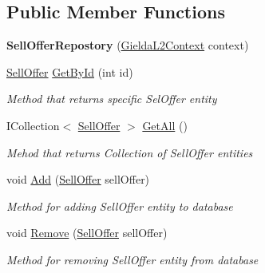 \subsection*{Public Member Functions}
\begin{DoxyCompactItemize}
\item 
\mbox{\label{class_gielda_l2_1_1_i_n_f_r_a_s_t_r_u_c_t_u_r_e_1_1_repositories_1_1_sell_offer_repostory_a01dce17dd39b709fafdcc2cd2d586fa6}} 
{\bfseries Sell\+Offer\+Repostory} (\mbox{\hyperlink{class_gielda_l2_1_1_d_b_1_1_gielda_l2_context}{Gielda\+L2\+Context}} context)
\item 
\mbox{\hyperlink{class_gielda_l2_1_1_d_b_1_1_entities_1_1_sell_offer}{Sell\+Offer}} \mbox{\hyperlink{class_gielda_l2_1_1_i_n_f_r_a_s_t_r_u_c_t_u_r_e_1_1_repositories_1_1_sell_offer_repostory_a66ee116572e1e4c959b50d3ad1c4698d}{Get\+By\+Id}} (int id)
\begin{DoxyCompactList}\small\item\em Method that returns specific Sel\+Offer entity \end{DoxyCompactList}\item 
I\+Collection$<$ \mbox{\hyperlink{class_gielda_l2_1_1_d_b_1_1_entities_1_1_sell_offer}{Sell\+Offer}} $>$ \mbox{\hyperlink{class_gielda_l2_1_1_i_n_f_r_a_s_t_r_u_c_t_u_r_e_1_1_repositories_1_1_sell_offer_repostory_a1dbfc870dcfaa42e29a440635c7b30d1}{Get\+All}} ()
\begin{DoxyCompactList}\small\item\em Mehod that returns Collection of Sell\+Offer entities \end{DoxyCompactList}\item 
void \mbox{\hyperlink{class_gielda_l2_1_1_i_n_f_r_a_s_t_r_u_c_t_u_r_e_1_1_repositories_1_1_sell_offer_repostory_a9998a9883c5ae73fb854eeff44075e73}{Add}} (\mbox{\hyperlink{class_gielda_l2_1_1_d_b_1_1_entities_1_1_sell_offer}{Sell\+Offer}} sell\+Offer)
\begin{DoxyCompactList}\small\item\em Method for adding Sell\+Offer entity to database \end{DoxyCompactList}\item 
void \mbox{\hyperlink{class_gielda_l2_1_1_i_n_f_r_a_s_t_r_u_c_t_u_r_e_1_1_repositories_1_1_sell_offer_repostory_ad66a43f51403182c2c341f8fcfc77715}{Remove}} (\mbox{\hyperlink{class_gielda_l2_1_1_d_b_1_1_entities_1_1_sell_offer}{Sell\+Offer}} sell\+Offer)
\begin{DoxyCompactList}\small\item\em Method for removing Sell\+Offer entity from database \end{DoxyCompactList}\end{DoxyCompactItemize}
